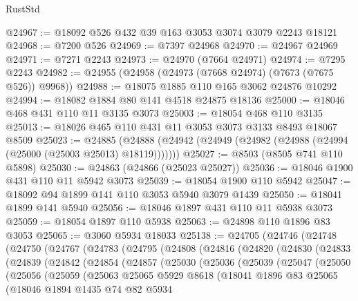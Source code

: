 \begin{lexlean}{RustStd}
\begin{coremodule}
@24967 := @18092 @526 @432 @39 @163 @3053 @3074 @3079 @2243 @18121
@24968 := @7200 @526
@24969 := @7397 @24968
@24970 := @24967 @24969
@24971 := @7271 @2243
@24973 := @24970 (@7664 @24971)
@24974 := @7295 @2243
@24982 := @24955 (@24958 (@24973 (@7668 @24974) (@7673 (@7675 @526)) @9968))
@24988 := @18075 @1885 @110 @165 @3062 @24876 @10292
@24994 := @18082 @1884 @80 @141 @4518 @24875 @18136
@25000 := @18046 @468 @431 @110 @11 @3135 @3073
@25003 := @18054 @468 @110 @3135
@25013 := @18026 @465 @110 @431 @11 @3053 @3073 @3133 @8493 @18067 @8509
@25023 := @24885
    (@24888 (@24942 (@24949 (@24982 (@24988 (@24994 (@25000 (@25003 @25013) @18119)))))))
@25027 := @8503 (@8505 @741 @110 @5898)
@25030 := @24863 (@24866 (@25023 @25027))
@25036 := @18046 @1900 @431 @110 @11 @5942 @3073
@25039 := @18054 @1900 @110 @5942
@25047 := @18092 @94 @1899 @141 @110 @3053 @5940 @3079 @1439
@25050 := @18041 @1899 @141 @5940
@25056 := @18046 @1897 @431 @110 @11 @5938 @3073
@25059 := @18054 @1897 @110 @5938
@25063 := @24898 @110 @1896 @83 @3053
@25065 := @3060 @5934 @18033
@25138 := @24705
    (@24746
      (@24748
        (@24750
          (@24767
            (@24783
              (@24795
                (@24808
                  (@24816
                    (@24820
                      (@24830
                        (@24833
                          (@24839
                            (@24842
                              (@24854
                                (@24857
                                  (@25030
                                    (@25036
                                      (@25039
                                        (@25047
                                          (@25050
                                            (@25056
                                              (@25059
                                                (@25063
                                                  @25065
                                                  @5929
                                                  @8618
                                                  (@18041
                                                    @1896
                                                    @83
                                                    @25065
                                                    (@18046
                                                      @1894
                                                      @1435
                                                      @74
                                                      @82
                                                      @5934

\end{coremodule}
\end{lexlean}
